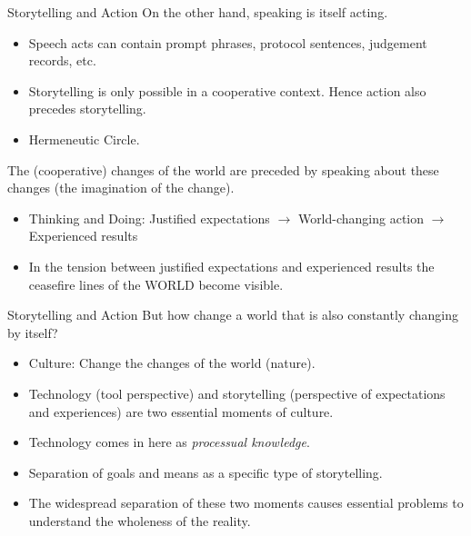 \documentclass{beamer}
\begin{document}
\begin{frame}{Storytelling and Action}
On the other hand, speaking is itself acting.
\begin{itemize}
\item Speech acts can contain prompt phrases, protocol sentences, judgement
  records, etc.
\item Storytelling is only possible in a cooperative context. Hence action
  also precedes storytelling.
\item Hermeneutic Circle.
\end{itemize}
The (cooperative) changes of the world are preceded by speaking about these
changes (the imagination of the change).
\begin{itemize}
\item Thinking and Doing: Justified expectations $\to$ World-changing action
  $\to$ Experienced results
\item In the tension between justified expectations and experienced results
  the ceasefire lines of the WORLD become visible.
\end{itemize}
\end{frame}
\begin{frame}{Storytelling and Action}
But how change a world that is also constantly changing by itself?
\begin{itemize}
\item Culture: Change the changes of the world (nature).
\item Technology (tool perspective) and storytelling (perspective of
  expectations and experiences) are two essential moments of culture.
\item Technology comes in here as \emph{processual knowledge}. 
\item Separation of goals and means as a specific type of storytelling.
\item The widespread separation of these two moments causes essential problems
  to understand the wholeness of the reality.
\end{itemize}
\end{frame}
\end{document}
